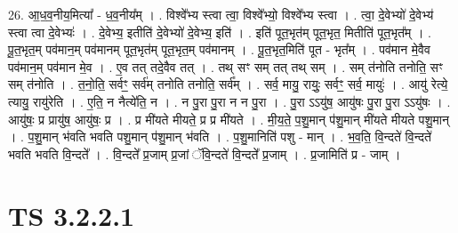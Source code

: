 \documentclass[17pt]{extarticle}
\begin{document}
26. आ॒ध॒व॒नीय॒मित्या᳚ - ध॒व॒नीय᳚म् । . विश्वे᳚भ्य स्त्वा त्वा॒ विश्वे᳚भ्यो॒ विश्वे᳚भ्य स्त्वा । . त्वा॒ दे॒वेभ्यो॑ दे॒वेभ्य॑ स्त्वा त्वा दे॒वेभ्यः॑ । . दे॒वेभ्य॒ इतीति॑ दे॒वेभ्यो॑ दे॒वेभ्य॒ इति॑ । . इति॑ पूत॒भृत॑म् पूत॒भृत॒ मितीति॑ पूत॒भृत᳚म् । . पू॒त॒भृत॒म् पव॑मान॒म् पव॑मानम् पूत॒भृत॑म् पूत॒भृत॒म् पव॑मानम् । . पू॒त॒भृत॒मिति॑ पूत - भृत᳚म् । . पव॑मान मे॒वैव पव॑मान॒म् पव॑मान मे॒व । . ए॒व तत् तदे॒वैव तत् । . तथ् सꣳ सम् तत् तथ् सम् । . सम् त॑नोति तनोति॒ सꣳ सम् त॑नोति । . त॒नो॒ति॒ सर्वꣳ॒॒ सर्व॑म् तनोति तनोति॒ सर्व᳚म् । . सर्व॒ मायु॒ रायुः॒ सर्वꣳ॒॒ सर्व॒ मायुः॑ । . आयु॑ रेत्ये॒ त्यायु॒ रायु॑रेति । . ए॒ति॒ न नैत्ये॑ति॒ न । . न पु॒रा पु॒रा न न पु॒रा । . पु॒रा ऽऽयु॑ष॒ आयु॑षः पु॒रा पु॒रा ऽऽयु॑षः । . आयु॑षः॒ प्र प्रायु॑ष॒ आयु॑षः॒ प्र । . प्र मी॑यते मीयते॒ प्र प्र मी॑यते । . मी॒य॒ते॒ प॒शु॒मान् प॑शु॒मान् मी॑यते मीयते पशु॒मान् । . प॒शु॒मान् भ॑वति भवति पशु॒मान् प॑शु॒मान् भ॑वति । . प॒शु॒मानिति॑ पशु - मान् । . भ॒व॒ति॒ वि॒न्दते॑ वि॒न्दते॑ भवति भवति वि॒न्दते᳚ । . वि॒न्दते᳚ प्र॒जाम् प्र॒जां ॅवि॒न्दते॑ वि॒न्दते᳚ प्र॒जाम् । . प्र॒जामिति॑ प्र - जाम् । \newline


\section{ TS 3.2.2.1 }
\end{document}
